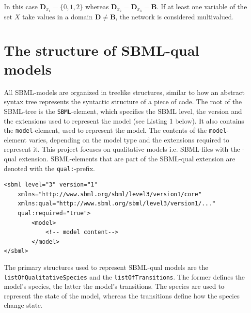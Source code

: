 In this case $\mathbf{D}_{x_1}=\{0,1,2\}$ whereas $\mathbf{D}_{x_2}=\mathbf{D}_{x_3}=\mathbf{B}$. If at least one variable of the set $X$ take values in a domain $\mathbf{D}\neq \mathbf{B}$, the network is considered multivalued.

\section{The structure of SBML-qual models}
All SBML-models are organized in treelike structures, similar to how an abstract syntax tree represents the syntactic structure of a piece of code. The root of the SBML-tree is the \verb+SBML+-element, which specifies the SBML level, the version and the extensions used to represent the model (see Listing 1 below). It also contains the \verb+model+-element, used to represent the model. The contents of the \verb+model+-element varies, depending on the model type and the extensions required to represent it. This project focuses on qualitative models i.e. SBML-files with the -qual extension. SBML-elements that are part of the SBML-qual extension are denoted with the \texttt{qual:}-prefix.

\begin{lstlisting}[language=SBML, caption=Outer structure of an SBML-qual model]
<sbml level="3" version="1"
    xmlns="http://www.sbml.org/sbml/level3/version1/core"
    xmlns:qual="http://www.sbml.org/sbml/level3/version1/..."
    qual:required="true">
        <model>
            <!-- model content-->
        </model>
</sbml>

\end{lstlisting}

The primary structures used to represent SBML-qual models are the \\
\texttt{listOfQualitativeSpecies} and the \texttt{listOfTransitions}. The former defines the model's species, the latter the model's transitions. The species are used to represent the state of the model, whereas the transitions define how the species change state. 

